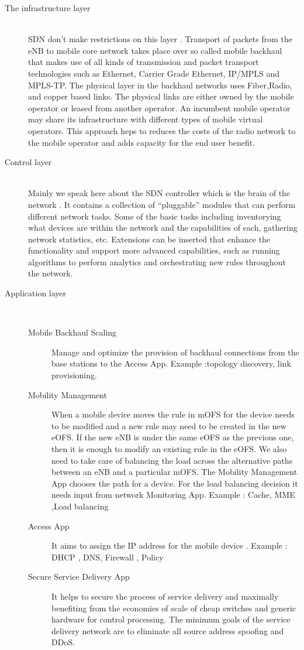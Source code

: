 \documentclass{article}
\begin{document}
\begin{description}
  \item[The infrastructure layer] \hfill \\ 
SDN don't make restrictions on this layer . Transport of packets from
the eNB to mobile core network takes place over so called mobile
backhaul that makes use of all kinds of transmission and packet
transport technologies such as Ethernet, Carrier Grade Ethernet,
IP/MPLS and MPLS-TP. The physical layer in the backhaul networks uses
Fiber,Radio, and copper based links. The physical links are either
owned by the mobile operator or leased from another operator. An
incumbent mobile operator may share its infrastructure with different
types of mobile virtual operators. This approach heps to reduces the
costs of the radio network to the mobile operator and adds capacity
for the end user benefit.
  \item[Control layer] \hfill \\ 
Mainly we speak here about the SDN controller which is the brain of
the network . It contains a collection of “pluggable” modules that can
perform different network tasks. Some of the basic tasks including
inventorying what devices are within the network and the capabilities
of each, gathering network statistics, etc. Extensions can be inserted
that enhance the functionality and support more advanced capabilities,
such as running algorithms to perform analytics and orchestrating new
rules throughout the network.
  \item[Application layer] \hfill \\ 


\begin{description}
  \item[Mobile Backhaul Scaling] 
Manage and optimize the provision of backhaul connections from the
base stations to the Access App.  Example :topology discovery, link
provisioning.
  \item[Mobility Management] 
When a mobile device moves the rule in mOFS for the device needs to be
modified and a new rule may need to be created in the new eOFS. If the
new eNB is under the same eOFS as the previous one, then it is enough
to modify an existing rule in the eOFS. We also need to take care of
balancing the load across the alternative paths between an eNB and a
particular mOFS. The Mobility Management App chooses the path for a
device. For the load balancing decision it needs input from network
Monitoring App.  Example : Cache, MME ,Load balancing
  \item[Access App]
It aims to assign the IP address for the mobile device .
Example : DHCP , DNS, Firewall , Policy
  \item[Secure Service Delivery App] 
It helps to secure the process of service delivery and maximally
benefiting from the economies of scale of cheap switches and generic
hardware for control processing. The minimum goals of the service
delivery network are to eliminate all source address spoofing and
DDoS.
\end{description}

\end{description}
\end{document}
